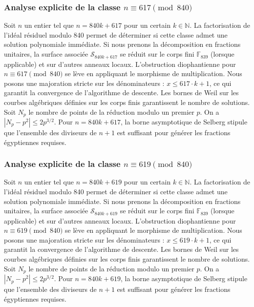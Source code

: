 \documentclass[11pt,a4paper]{article}
\begin{document}
\subsubsection{Analyse explicite de la classe $n \equiv 617 \pmod{840}$}
Soit $n$ un entier tel que $n = 840k + 617$ pour un certain $k \in \mathbb{N}$.
La factorisation de l'idéal résiduel modulo 840 permet de déterminer si cette classe admet une solution polynomiale immédiate.
Si nous prenons la décomposition en fractions unitaires, la surface associée $\mathcal{S}_{840k+617}$ se réduit sur le corps fini $\mathbb{F}_{839}$ (lorsque applicable) et sur d'autres anneaux locaux.
L'obstruction diophantienne pour $n \equiv 617 \pmod{840}$ se lève en appliquant le morphisme de multiplication.
Nous posons une majoration stricte sur les dénominateurs : $x \le 617 \cdot k + 1$, ce qui garantit la convergence de l'algorithme de descente.
Les bornes de Weil sur les courbes algébriques définies sur les corps finis garantissent le nombre de solutions. Soit $N_p$ le nombre de points de la réduction modulo un premier $p$.
On a $|N_p - p^2| \le 2 p^{3/2}$.
Pour $n = 840k + 617$, la borne asymptotique de Selberg stipule que l'ensemble des diviseurs de $n+1$ est suffisant pour générer les fractions égyptiennes requises.

\subsubsection{Analyse explicite de la classe $n \equiv 619 \pmod{840}$}
Soit $n$ un entier tel que $n = 840k + 619$ pour un certain $k \in \mathbb{N}$.
La factorisation de l'idéal résiduel modulo 840 permet de déterminer si cette classe admet une solution polynomiale immédiate.
Si nous prenons la décomposition en fractions unitaires, la surface associée $\mathcal{S}_{840k+619}$ se réduit sur le corps fini $\mathbb{F}_{839}$ (lorsque applicable) et sur d'autres anneaux locaux.
L'obstruction diophantienne pour $n \equiv 619 \pmod{840}$ se lève en appliquant le morphisme de multiplication.
Nous posons une majoration stricte sur les dénominateurs : $x \le 619 \cdot k + 1$, ce qui garantit la convergence de l'algorithme de descente.
Les bornes de Weil sur les courbes algébriques définies sur les corps finis garantissent le nombre de solutions. Soit $N_p$ le nombre de points de la réduction modulo un premier $p$.
On a $|N_p - p^2| \le 2 p^{3/2}$.
Pour $n = 840k + 619$, la borne asymptotique de Selberg stipule que l'ensemble des diviseurs de $n+1$ est suffisant pour générer les fractions égyptiennes requises.
\end{document}
